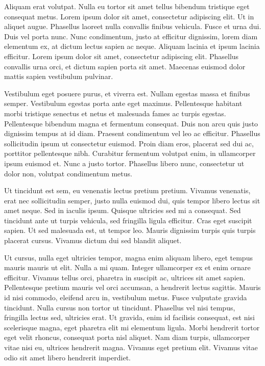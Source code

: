 Aliquam erat volutpat. Nulla eu tortor sit amet tellus bibendum tristique eget consequat metus. Lorem ipsum dolor sit amet, consectetur adipiscing elit. Ut in aliquet augue. Phasellus laoreet nulla convallis finibus vehicula. Fusce et urna dui. Duis vel porta nunc. Nunc condimentum, justo at efficitur dignissim, lorem diam elementum ex, at dictum lectus sapien ac neque. Aliquam lacinia et ipsum lacinia efficitur. Lorem ipsum dolor sit amet, consectetur adipiscing elit. Phasellus convallis urna orci, et dictum sapien porta sit amet. Maecenas euismod dolor mattis sapien vestibulum pulvinar.

Vestibulum eget posuere purus, et viverra est. Nullam egestas massa et finibus semper. Vestibulum egestas porta ante eget maximus. Pellentesque habitant morbi tristique senectus et netus et malesuada fames ac turpis egestas. Pellentesque bibendum magna et fermentum consequat. Duis non arcu quis justo dignissim tempus at id diam. Praesent condimentum vel leo ac efficitur. Phasellus sollicitudin ipsum ut consectetur euismod. Proin diam eros, placerat sed dui ac, porttitor pellentesque nibh. Curabitur fermentum volutpat enim, in ullamcorper ipsum euismod et. Nunc a justo tortor. Phasellus libero nunc, consectetur ut dolor non, volutpat condimentum metus.

Ut tincidunt est sem, eu venenatis lectus pretium pretium. Vivamus venenatis, erat nec sollicitudin semper, justo nulla euismod dui, quis tempor libero lectus sit amet neque. Sed in iaculis ipsum. Quisque ultricies sed mi a consequat. Sed tincidunt ante ut turpis vehicula, sed fringilla ligula efficitur. Cras eget suscipit sapien. Ut sed malesuada est, ut tempor leo. Mauris dignissim turpis quis turpis placerat cursus. Vivamus dictum dui sed blandit aliquet.

Ut cursus, nulla eget ultricies tempor, magna enim aliquam libero, eget tempus mauris mauris ut elit. Nulla a mi quam. Integer ullamcorper ex et enim ornare efficitur. Vivamus tellus orci, pharetra in suscipit ac, ultrices sit amet sapien. Pellentesque pretium mauris vel orci accumsan, a hendrerit lectus sagittis. Mauris id nisi commodo, eleifend arcu in, vestibulum metus. Fusce vulputate gravida tincidunt. Nulla cursus non tortor ut tincidunt. Phasellus vel nisi tempus, fringilla lectus sed, ultricies erat. Ut gravida, enim id facilisis consequat, est nisi scelerisque magna, eget pharetra elit mi elementum ligula. Morbi hendrerit tortor eget velit rhoncus, consequat porta nisl aliquet. Nam diam turpis, ullamcorper vitae nisi eu, ultrices hendrerit magna. Vivamus eget pretium elit. Vivamus vitae odio sit amet libero hendrerit imperdiet.

